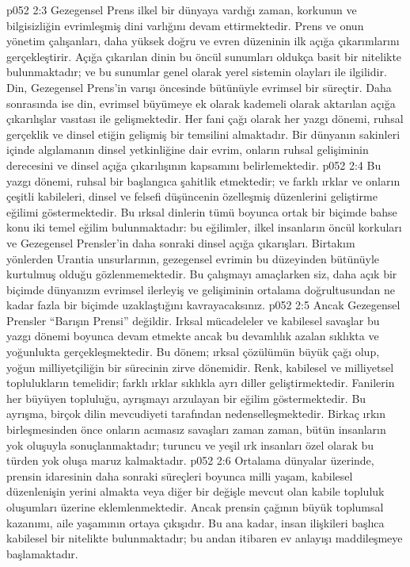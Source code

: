 \vs p052 2:3 Gezegensel Prens ilkel bir dünyaya vardığı zaman, korkunun ve bilgisizliğin evrimleşmiş dini varlığını devam ettirmektedir. Prens ve onun yönetim çalışanları, daha yüksek doğru ve evren düzeninin ilk açığa çıkarımlarını gerçekleştirir. Açığa çıkarılan dinin bu öncül sunumları oldukça basit bir nitelikte bulunmaktadır; ve bu sunumlar genel olarak yerel sistemin olayları ile ilgilidir. Din, Gezegensel Prens’in varışı öncesinde bütünüyle evrimsel bir süreçtir. Daha sonrasında ise din, evrimsel büyümeye ek olarak kademeli olarak aktarılan açığa çıkarılışlar vasıtası ile gelişmektedir. Her fani çağı olarak her yazgı dönemi, ruhsal gerçeklik ve dinsel etiğin gelişmiş bir temsilini almaktadır. Bir dünyanın sakinleri içinde algılamanın dinsel yetkinliğine dair evrim, onların ruhsal gelişiminin derecesini ve dinsel açığa çıkarılışının kapsamını belirlemektedir.
\vs p052 2:4 Bu yazgı dönemi, ruhsal bir başlangıca şahitlik etmektedir; ve farklı ırklar ve onların çeşitli kabileleri, dinsel ve felsefi düşüncenin özelleşmiş düzenlerini geliştirme eğilimi göstermektedir. Bu ırksal dinlerin tümü boyunca ortak bir biçimde bahse konu iki temel eğilim bulunmaktadır: bu eğilimler, ilkel insanların öncül korkuları ve Gezegensel Prensler’in daha sonraki dinsel açığa çıkarışları. Birtakım yönlerden Urantia unsurlarının, gezegensel evrimin bu düzeyinden bütünüyle kurtulmuş olduğu gözlenmemektedir. Bu çalışmayı amaçlarken siz, daha açık bir biçimde dünyanızın evrimsel ilerleyiş ve gelişiminin ortalama doğrultusundan ne kadar fazla bir biçimde uzaklaştığını kavrayacaksınız.
\vs p052 2:5 Ancak Gezegensel Prensler “Barışın Prensi” değildir. Irksal mücadeleler ve kabilesel savaşlar bu yazgı dönemi boyunca devam etmekte ancak bu devamlılık azalan sıklıkta ve yoğunlukta gerçekleşmektedir. Bu dönem; ırksal çözülümün büyük çağı olup, yoğun milliyetçiliğin bir sürecinin zirve dönemidir. Renk, kabilesel ve milliyetsel toplulukların temelidir; farklı ırklar sıklıkla ayrı diller geliştirmektedir. Fanilerin her büyüyen topluluğu, ayrışmayı arzulayan bir eğilim göstermektedir. Bu ayrışma, birçok dilin mevcudiyeti tarafından nedenselleşmektedir. Birkaç ırkın birleşmesinden önce onların acımasız savaşları zaman zaman, bütün insanların yok oluşuyla sonuçlanmaktadır; turuncu ve yeşil ırk insanları özel olarak bu türden yok oluşa maruz kalmaktadır.
\vs p052 2:6 Ortalama dünyalar üzerinde, prensin idaresinin daha sonraki süreçleri boyunca milli yaşam, kabilesel düzenlenişin yerini almakta veya diğer bir değişle mevcut olan kabile topluluk oluşumları üzerine eklemlenmektedir. Ancak prensin çağının büyük toplumsal kazanımı, aile yaşamının ortaya çıkışıdır. Bu ana kadar, insan ilişkileri başlıca kabilesel bir nitelikte bulunmaktadır; bu andan itibaren ev anlayışı maddileşmeye başlamaktadır.
